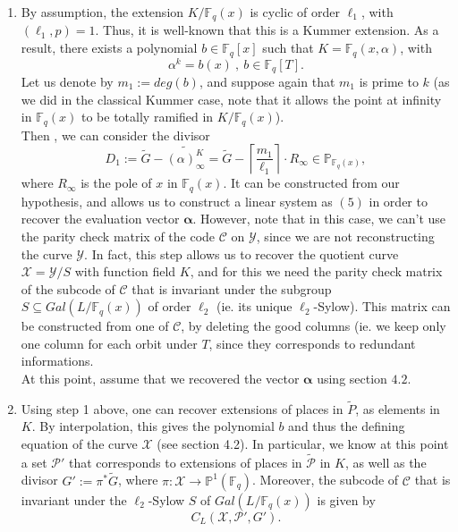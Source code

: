 \documentclass[10pt]{article}
\newcommand{\cd}{\cdot}
\newcommand{\fq}{\mathbb{F}_q}
\newcommand{\su}{\subseteq}
\newcommand{\X}{\mathcal{X}}
\newcommand{\Y}{\mathcal{Y}}
\newcommand{\PR}{\mathcal{P}}
\begin{document}
\begin{enumerate}
\item By assumption, the extension $K/\fq(x)$ is cyclic of order $\ell_1$, with $(\ell_1,p)=1$. Thus, it is well-known that this is a Kummer extension. As a result, there exists a polynomial $b \in \fq[x]$ such that $K = \fq(x,\alpha)$, with
\[ \alpha^k = b(x) \ , \ b \in \fq[T].\] Let us denote by $m_1:=deg(b)$, and suppose again that $m_1$ is prime to $k$ (as we did in the classical Kummer case, note that it allows the point at infinity in $\fq(x)$ to be totally ramified in $K/\fq(x)$). \\ Then , we can consider the divisor
\[D_1 := \tilde{G} - \widetilde{(\alpha)^K_{\infty}} = \tilde{G} - \left\lceil\frac{m_1}{\ell_1}\right\rceil \cd R_{\infty} \in \mathbb{P}_{\fq(x)},\]
where $R_{\infty}$ is the pole of $x$ in $\fq(x)$. It can be constructed from our hypothesis, and allows us to construct a linear system as $(5)$ in order to recover the evaluation vector $\boldsymbol{\alpha}$. However, note that in this case, we can't use the parity check matrix of the code $\mathcal{C}$ on $\Y$, since we are not reconstructing the curve $\Y$. In fact, this step allows us to recover the quotient curve $\X = \Y/S$ with function field $K$, and for this we need the parity check matrix of the subcode of $\mathcal{C}$ that is invariant under the subgroup $S \su Gal(L/\fq(x))$ of order $\ell_2$ (ie. its unique $\ell_2$-Sylow). This matrix can be constructed from one of $\mathcal{C}$, by deleting the good columns (ie. we keep only one column for each orbit under $T$, since they corresponds to redundant informations. \\
At this point, assume that we recovered the vector $\boldsymbol{\alpha}$ using section $4.2$.

\item Using step 1 above, one can recover extensions of places in $\tilde{P}$, as elements in $K$. By interpolation, this gives the polynomial $b$ and thus the defining equation of the curve $\X$ (see section 4.2). In particular, we know at this point a set $\PR'$ that corresponds to extensions of places in $\tilde{\PR}$ in $K$, as well as the divisor $G' := \pi^*\tilde{G}$, where $\pi : \X \rightarrow \mathbb{P}^1(\fq)$. Moreover, the subcode of $\mathcal{C}$ that is invariant under the $\ell_2$-Sylow $S$ of $Gal(L/\fq(x))$ is given by 
\[C_L(\X,\PR',G').\]


\end{enumerate}
\end{document}
